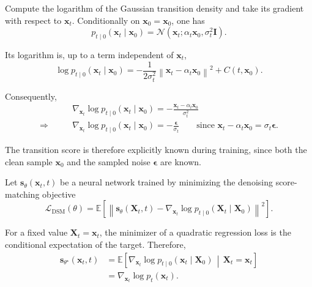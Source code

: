 \documentclass[11pt,a4paper]{article}
\begin{document}
\begin{compactproof}[title={Proof}]
Compute the logarithm of the Gaussian transition density and take its gradient with respect to $\mathbf{x}_t$.
Conditionally on $\mathbf{x}_0=\mathbf{x}_0$, one has
\begin{equation*}
p_{t\mid 0}(\mathbf{x}_t\mid\mathbf{x}_0)
=
\mathcal{N}
\left(
\mathbf{x}_t;
\alpha_t\mathbf{x}_0,
\sigma_t^2\mathbf{I}
\right).
\end{equation*}

Its logarithm is, up to a term independent of $\mathbf{x}_t$,
\begin{equation*}
\log p_{t\mid 0}(\mathbf{x}_t\mid\mathbf{x}_0)
=
-\frac{1}{2\sigma_t^2}
\left\|
\mathbf{x}_t-\alpha_t\mathbf{x}_0
\right\|^2
+
C(t,\mathbf{x}_0).
\end{equation*}

Consequently,
\begin{align*}
&\nabla_{\mathbf{x}_t}
\log p_{t\mid 0}(\mathbf{x}_t\mid\mathbf{x}_0)
=
-\frac{
\mathbf{x}_t-\alpha_t\mathbf{x}_0
}{
\sigma_t^2
}
\\
\Rightarrow\qquad
&
\boxed{
\nabla_{\mathbf{x}_t}
\log p_{t\mid 0}(\mathbf{x}_t\mid\mathbf{x}_0)
=
-\frac{\boldsymbol{\epsilon}}{\sigma_t}
}
\qquad
{\scriptstyle
\text{since }
\mathbf{x}_t-\alpha_t\mathbf{x}_0
=
\sigma_t\boldsymbol{\epsilon}.
}
\end{align*}

\end{compactproof}

The transition score is therefore explicitly known during training, since both the clean sample $\mathbf{x}_0$ and the sampled noise $\boldsymbol{\epsilon}$ are known.

Let $\mathbf{s}_{\theta}(\mathbf{x}_t,t)$ be a neural network trained by minimizing the denoising score-matching objective
\begin{equation*}
\mathcal{L}_{\mathrm{DSM}}(\theta)
=
\mathbb{E}
\left[
\left\|
\mathbf{s}_{\theta}(\mathbf{X}_t,t)
-
\nabla_{\mathbf{x}_t}
\log p_{t\mid 0}
(\mathbf{X}_t\mid\mathbf{X}_0)
\right\|^2
\right].
\end{equation*}

For a fixed value $\mathbf{X}_t=\mathbf{x}_t$, the minimizer of a quadratic regression loss is the conditional expectation of the target. Therefore,
\begin{align*}
\mathbf{s}_{\theta^\star}(\mathbf{x}_t,t)
&=
\mathbb{E}
\left[
\nabla_{\mathbf{x}_t}
\log p_{t\mid 0}
(\mathbf{x}_t\mid\mathbf{X}_0)
\,\middle|\,
\mathbf{X}_t=\mathbf{x}_t
\right]
\\
&=
\nabla_{\mathbf{x}_t}
\log p_t(\mathbf{x}_t).
\end{align*}
\end{document}

